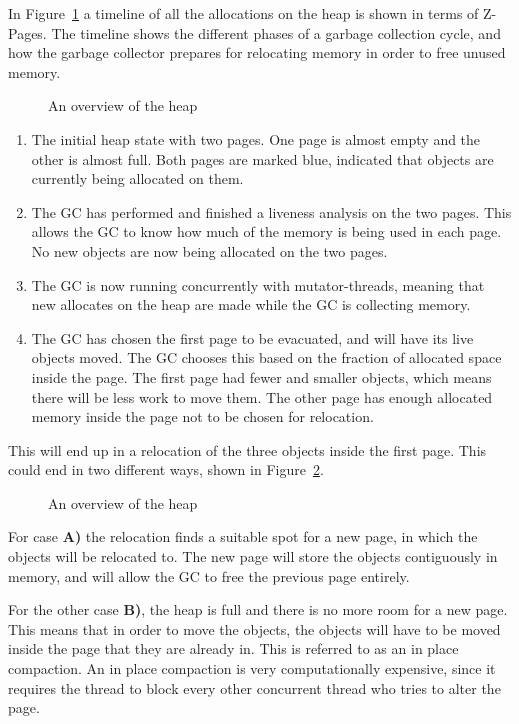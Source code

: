 In Figure~\ref{fig:zgc_timeline} a timeline of all the allocations on the heap is shown in terms of Z-Pages. The timeline shows the different phases of a garbage collection cycle, and how the garbage collector prepares for relocating memory in order to free unused memory.

\begin{figure}[!h]
    \centering
    
    \caption{An overview of the heap}
    \label{fig:zgc_timeline}
\end{figure}

\begin{enumerate}
    \item The initial heap state with two pages. One page is almost empty and the other is almost full. Both pages are marked blue, indicated that objects are currently being allocated on them.
    \item The GC has performed and finished a liveness analysis on the two pages. This allows the GC to know how much of the memory is being used in each page. No new objects are now being allocated on the two pages.
    \item The GC is now running concurrently with mutator-threads, meaning that new allocates on the heap are made while the GC is collecting memory.
    \item The GC has chosen the first page to be evacuated, and will have its live objects moved. The GC chooses this based on the fraction of allocated space inside the page. The first page had fewer and smaller objects, which means there will be less work to move them. The other page has enough allocated memory inside the page not to be chosen for relocation.
\end{enumerate}

This will end up in a relocation of the three objects inside the first page. This could end in two different ways, shown in Figure~\ref{fig:zreloc}.

\begin{figure}[!h]
    \centering
    
    \caption{An overview of the heap}
    \label{fig:zreloc}
\end{figure}
For case \textbf{A)} the relocation finds a suitable spot for a new page, in which the objects will be relocated to. The new page will store the objects contiguously in memory, and will allow the GC to free the previous page entirely.

For the other case \textbf{B)}, the heap is full and there is no more room for a new page. This means that in order to move the objects, the objects will have to be moved inside the page that they are already in. This is referred to as an in place compaction. An in place compaction is very computationally expensive, since it requires the thread to block every other concurrent thread who tries to alter the page. 
